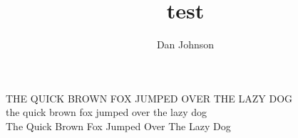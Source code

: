 \documentclass[12pt,a4paper]{article}
\author{Dan Johnson}
\title{test}
\begin{document}

    THE QUICK BROWN FOX JUMPED OVER THE LAZY DOG\\
    the quick brown fox jumped over the lazy dog\\
    The Quick Brown Fox Jumped Over The Lazy Dog
\end{document}
